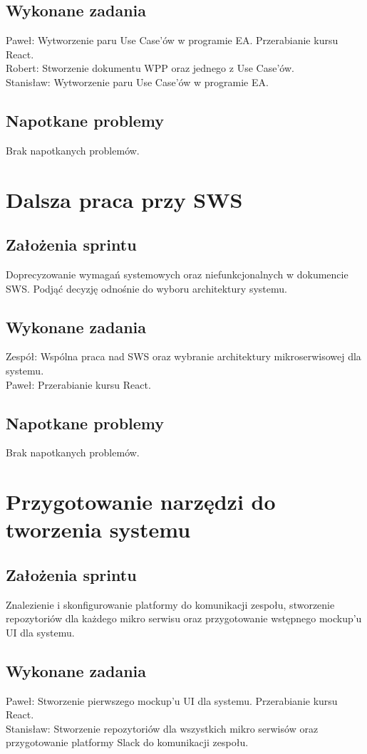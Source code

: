 \documentclass[a4paper,11pt]{report}
\begin{document}
\subsection {Wykonane zadania}
Paweł: Wytworzenie paru Use Case'ów w programie EA. Przerabianie kursu React.\\
Robert: Stworzenie dokumentu WPP oraz jednego z Use Case'ów.\\
Stanisław: Wytworzenie paru Use Case'ów w programie EA.\\
\subsection {Napotkane problemy}
Brak napotkanych problemów.

\section {Dalsza praca przy SWS}
\subsection {Założenia sprintu}
Doprecyzowanie wymagań systemowych oraz niefunkcjonalnych w dokumencie SWS. Podjąć decyzję odnośnie do wyboru architektury systemu.
\subsection {Wykonane zadania}
Zespół: Wspólna praca nad SWS oraz wybranie architektury mikroserwisowej dla systemu.\\
Paweł: Przerabianie kursu React.\\
\subsection {Napotkane problemy}
Brak napotkanych problemów.

\section {Przygotowanie narzędzi do tworzenia systemu}
\subsection {Założenia sprintu}
Znalezienie i skonfigurowanie platformy do komunikacji zespołu, stworzenie repozytoriów dla każdego mikro serwisu oraz przygotowanie wstępnego mockup'u UI dla systemu.
\subsection {Wykonane zadania}
Paweł: Stworzenie pierwszego mockup'u UI dla systemu. Przerabianie kursu React. \\
Stanisław: Stworzenie repozytoriów dla wszystkich mikro serwisów oraz przygotowanie platformy Slack do komunikacji zespołu.\\
\end{document}
